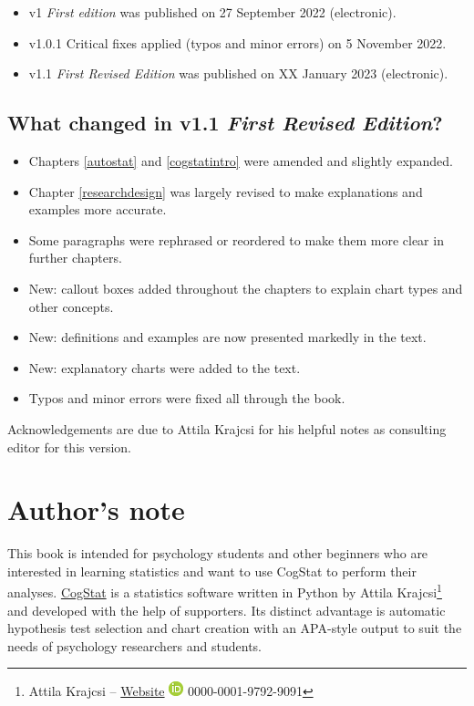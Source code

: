 \documentclass[
]{book}
\providecommand{\tightlist}{%
  \setlength{\itemsep}{0pt}\setlength{\parskip}{0pt}}
\theoremstyle{definition}
\theoremstyle{definition}
\theoremstyle{definition}
\theoremstyle{definition}
\theoremstyle{remark}
\begin{document}
\begin{itemize}
\tightlist
\item
  v1 \emph{First edition} was published on 27 September 2022 (electronic).
\item
  v1.0.1 Critical fixes applied (typos and minor errors) on 5 November 2022.
\item
  v1.1 \emph{First Revised Edition} was published on XX January 2023 (electronic).
\end{itemize}

\hypertarget{what-changed-in-v1.1-first-revised-edition}{%
\subsection*{\texorpdfstring{What changed in v1.1 \emph{First Revised Edition}?}{What changed in v1.1 First Revised Edition?}}\label{what-changed-in-v1.1-first-revised-edition}}

\begin{itemize}
\tightlist
\item
  Chapters \ref{autostat} and \ref{cogstatintro} were amended and slightly expanded.
\item
  Chapter \ref{researchdesign} was largely revised to make explanations and examples more accurate.
\item
  Some paragraphs were rephrased or reordered to make them more clear in further chapters.
\item
  New: callout boxes added throughout the chapters to explain chart types and other concepts.
\item
  New: definitions and examples are now presented markedly in the text.
\item
  New: explanatory charts were added to the text.
\item
  Typos and minor errors were fixed all through the book.
\end{itemize}

Acknowledgements are due to Attila Krajcsi for his helpful notes as consulting editor for this version.

\hypertarget{authors-note}{%
\section*{Author's note}\label{authors-note}}

This book is intended for psychology students and other beginners who are interested in learning statistics and want to use CogStat to perform their analyses. \href{https://www.cogstat.org}{CogStat} is a statistics software written in Python by Attila Krajcsi\footnote{Attila Krajcsi -- \href{http://www.attilakrajcsi.hu}{Website} \textbar{} \href{https://orcid.org/0000-0001-9792-9091}{\includegraphics{resources/image/orcid_16x16.png}} 0000-0001-9792-9091} and developed with the help of supporters. Its distinct advantage is automatic hypothesis test selection and chart creation with an APA-style output to suit the needs of psychology researchers and students.
\end{document}

